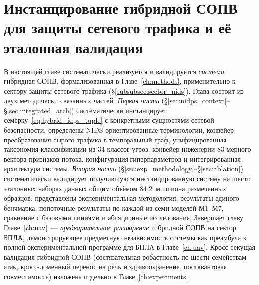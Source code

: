 
\chapter{Инстанцирование гибридной СОПВ для защиты сетевого трафика и её эталонная валидация}
\label{ch:adaptation}

В настоящей главе систематически реализуется и валидируется
\emph{система} гибридная СОПВ, формализованная в Главе~\ref{ch:methods},
применительно к сектору защиты сетевого трафика (\S\ref{subsubsec:sector_nids}).
Глава состоит из двух методически связанных частей. \emph{Первая
часть} (\S\ref{sec:nidps_context}--\S\ref{sec:integrated_arch})
систематически инстанцирует семёрку~\eqref{eq:hybrid_idps_tuple} с
конкретными сущностями сетевой безопасности: определены
NIDS-ориентированные терминологии, конвейер преобразования сырого
трафика в темпоральный граф, унифицированная таксономия классификации
из 34 классов угроз, конвейер инженерии 83-мерного вектора признаков
потока, конфигурация гиперпараметров и интегрированная архитектура
системы. \emph{Вторая часть}
(\S\ref{sec:exp_methodology}--\S\ref{sec:ablation}) систематически
валидирует получившуюся инстанцированную систему на шести
эталонных наборах данных общим объёмом 84{,}2~миллиона размеченных
образцов: представлены экспериментальная методология, результаты
единого бенчмарка, попоточные результаты по каждой из семи моделей
М1--М7, сравнение с базовыми линиями и абляционные исследования.
Завершает главу
Главе~\ref{ch:uav}~--- \emph{предварительное расширение}
гибридной СОПВ на сектор БПЛА, демонстрирующее предметную
независимость системы как преамбула к полной экспериментальной
программе для БПЛА в Главе~\ref{ch:uav}. Кросс-секущая валидация
гибридной СОПВ (состязательная робастность по шести семействам
атак, кросс-доменный перенос на речь и здравоохранение,
постквантовая совместимость) изложена отдельно в
Главе~\ref{ch:experiments}.


